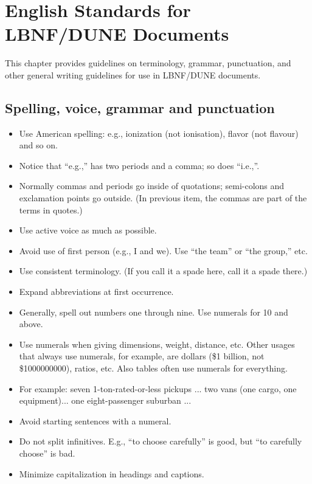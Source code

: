 \chapter{English Standards for LBNF/DUNE Documents}
\label{ch:english-stds}

This chapter provides guidelines on terminology, grammar, punctuation, and other general writing guidelines for use in LBNF/DUNE documents. 


\section{Spelling, voice, grammar and punctuation}
\label{sec:spelling}

\begin{itemize}
\item Use American spelling: e.g., ionization (not ionisation), flavor (not flavour) and so on.
\item Notice that ``e.g.,'' has two periods and a comma; so does ``i.e.,''.
\item Normally commas and periods go inside of quotations;  semi-colons and exclamation points go outside.  (In previous item, the commas are part of the terms in quotes.)
\item Use active voice as much as possible. 
\item Avoid use of first person (e.g., I and we). Use ``the team'' or ``the group,'' etc.
\item Use consistent terminology. (If you call it a spade here, call it a spade there.)
\item Expand abbreviations at first occurrence.
\item Generally, spell out numbers one through nine. Use numerals for \num{10} and above.
\item Use numerals when giving dimensions, weight, distance, etc. Other usages that always use numerals, for example, are dollars (\$1 billion, not \$\num{1000000000}), ratios, etc. Also tables often use numerals for everything.
\item For example: seven 1-ton-rated-or-less pickups ... two vans (one cargo, one equipment)... one eight-passenger suburban ...
\item Avoid starting sentences with a numeral.
\item Do not split infinitives. E.g., ``to choose carefully'' is good, but ``to carefully choose'' is bad.
\item Minimize capitalization in headings and captions.

\end{itemize}
